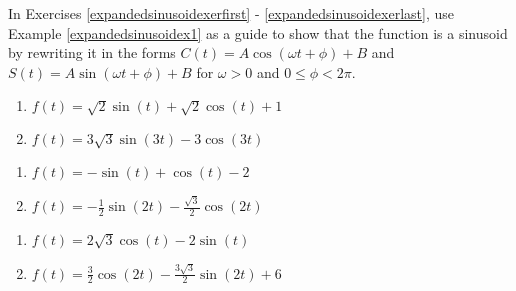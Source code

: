 \newpage

In Exercises \ref{expandedsinusoidexerfirst} - \ref{expandedsinusoidexerlast}, use Example \ref{expandedsinusoidex1} as a guide to show that the function is a sinusoid by rewriting it in the forms $C(t) = A \cos(\omega t + \phi) + B$ and $S(t) = A \sin(\omega t + \phi) + B$ for $\omega > 0$ and $0 \leq \phi < 2\pi$.

\begin{multicols}{2}

\begin{enumerate}

\setcounter{enumi}{\value{HW}}

\item $f(t) = \sqrt{2}\sin(t) + \sqrt{2}\cos(t) + 1$ \label{expandedsinusoidexerfirst}
\item $f(t) = 3\sqrt{3}\sin(3t) - 3\cos(3t)$

\setcounter{HW}{\value{enumi}}

\end{enumerate}

\end{multicols}

\begin{multicols}{2}

\begin{enumerate}

\setcounter{enumi}{\value{HW}}

\item $f(t) = -\sin(t) + \cos(t) - 2$  
\item $f(t) = -\frac{1}{2}\sin(2t) - \frac{\sqrt{3}}{2}\cos(2t)$

\setcounter{HW}{\value{enumi}}

\end{enumerate}

\end{multicols}

\begin{multicols}{2}

\begin{enumerate}

\setcounter{enumi}{\value{HW}}

\item  $f(t) = 2\sqrt{3} \cos(t) - 2\sin(t)$  
\item  $f(t) = \frac{3}{2} \cos(2t) - \frac{3\sqrt{3}}{2} \sin(2t) + 6$

\setcounter{HW}{\value{enumi}}

\end{enumerate}

\end{multicols}

